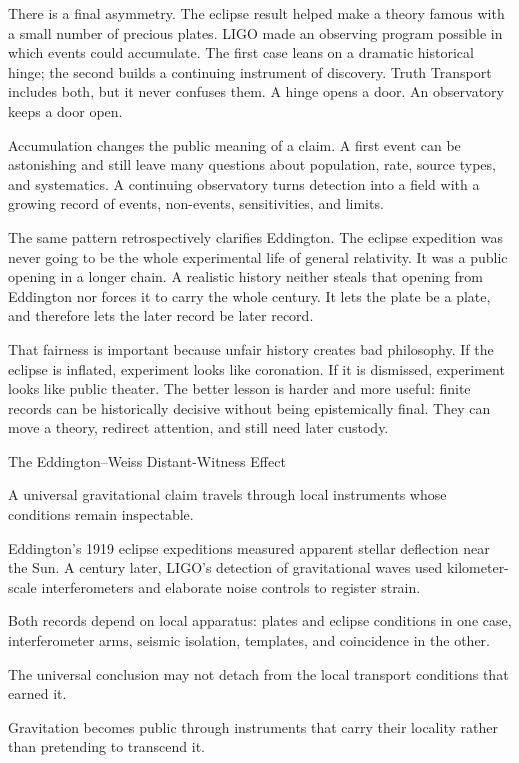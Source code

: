 There is a final asymmetry. The eclipse result helped make a theory
famous with a small number of precious plates. LIGO made an observing
program possible in which events could accumulate. The first case leans
on a dramatic historical hinge; the second builds a continuing instrument
of discovery. Truth Transport includes both, but it never confuses them.
A hinge opens a door. An observatory keeps a door open.

Accumulation changes the public meaning of a claim. A first event can be
astonishing and still leave many questions about population, rate, source
types, and systematics. A continuing observatory turns detection into a
field with a growing record of events, non-events, sensitivities, and
limits.

The same pattern retrospectively clarifies Eddington. The eclipse
expedition was never going to be the whole experimental life of general
relativity. It was a public opening in a longer chain. A realistic
history neither steals that opening from Eddington nor forces it to
carry the whole century. It lets the plate be a plate, and therefore
lets the later record be later record.

That fairness is important because unfair history creates bad
philosophy. If the eclipse is inflated, experiment looks like
coronation. If it is dismissed, experiment looks like public theater.
The better lesson is harder and more useful: finite records can be
historically decisive without being epistemically final. They can move a
theory, redirect attention, and still need later custody.

\begin{phenom}{The Eddington--Weiss Distant-Witness Effect~\cite{abbott2016,eddington1920}}
\label{ph:eddington-weiss-distant-witness}

\PhStatement
A universal gravitational claim travels through local instruments whose
conditions remain inspectable.

\PhOrigin
Eddington's 1919 eclipse expeditions measured apparent stellar deflection near
the Sun. A century later, LIGO's detection of gravitational waves used
kilometer-scale interferometers and elaborate noise controls to register strain.

\PhObservation
Both records depend on local apparatus: plates and eclipse conditions in one
case, interferometer arms, seismic isolation, templates, and coincidence in the
other.

\PhConstraint
The universal conclusion may not detach from the local transport conditions
that earned it.

\PhConsequence
Gravitation becomes public through instruments that carry their locality rather
than pretending to transcend it.
\end{phenom}

